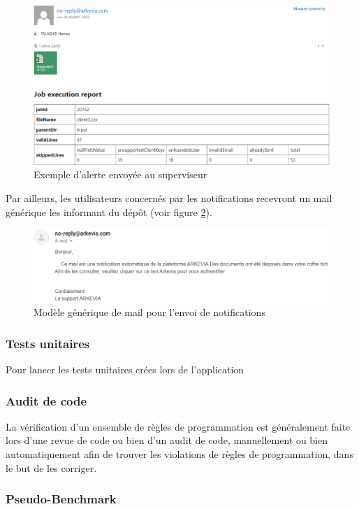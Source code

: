 \begin{figure}[H]
    \includegraphics[width=\linewidth]{images/sec5/monitoring_mail.png}
    \caption{Exemple d'alerte envoyée au superviseur}
    \label{fig:monitoring_mail}
\end{figure}
Par ailleurs, les utilisateurs concernés par les notifications recevront un mail générique les informant du dépôt (voir figure \ref{fig:notification_mail}).
\begin{figure}[H]
    \includegraphics[width=0.95\linewidth]{images/sec5/notification_mail.png}
    \caption{Modèle générique de mail pour l'envoi de notifications}
    \label{fig:notification_mail}
\end{figure}
\subsubsection{Tests unitaires}
Pour lancer les tests unitaires crées lors de l'application
\subsubsection{Audit de code}
La vérification d'un ensemble de règles de programmation est généralement faite lors d'une revue de code ou bien d'un audit de code, manuellement ou bien automatiquement afin de trouver les violations de règles de programmation, dans le but de les corriger.
\subsubsection{Pseudo-Benchmark}
